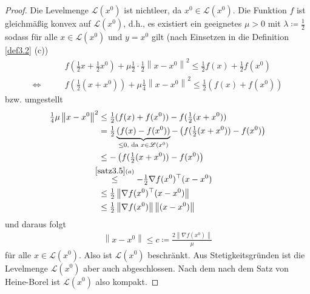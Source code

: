 \documentclass[a4paper,reqno]{amsart}
\theoremstyle{definition}
\theoremstyle{remark}
\newcommand\norm[1]{\left\lVert#1\right\rVert}
\begin{document}
\begin{proof}
    Die Levelmenge $\mathscr{L}(x^0)$ ist nichtleer, da
    $x^0\in\mathscr{L}(x^0)$.
    Die Funktion $f$ ist gleichmäßig konvex auf $\mathscr{L}(x^0)$,
    d.h., es existiert ein geeignetes $\mu>0$ mit $\lambda\coloneqq\frac{1}{2}$
    sodass für alle $x\in\mathscr{L}(x^0)$ und $y=x^0$ gilt (nach
    Einsetzen in die Definition \ref{def3.2} (c))
    \begin{align*}
        & f(\tfrac{1}{2} x+ \tfrac{1}{2}x^0) + \mu\tfrac{1}{2}\cdot\tfrac{1}{2}\norm{x-x^0}^2
        \leq \tfrac{1}{2} f(x) + \tfrac{1}{2}f(x^0)\\
        \Leftrightarrow\qquad
        & f(\tfrac{1}{2} (x+ x^0)) + \mu\tfrac{1}{4}\norm{x-x^0}^2
        \leq \tfrac{1}{2}\left( f(x) + f(x^0)\right)
    \end{align*}
    bzw. umgestellt
    \begin{align*}
        \tfrac{1}{4}\mu\norm{x-x^0}^2
        &\leq \tfrac{1}{2}( f(x) + f(x^0)) - f(\tfrac{1}{2} (x+ x^0))\\
        &= \tfrac{1}{2}\underbrace{( f(x) - f(x^0))}_{\leq0, \text{ da } x\in\mathscr{L}(x^0)}
        - \left(f(\tfrac{1}{2} (x+ x^0)) - f(x^0)\right)\\
        &\leq - \left(f(\tfrac{1}{2} (x+ x^0)) - f(x^0)\right)\\
        &\!\!\!\!\stackrel{\ref{satz3.5} (a)}{\leq}
        - \tfrac{1}{2}\nabla f(x^0)^\top(x-x^0)\\
        &\leq 
        \tfrac{1}{2}\norm{\nabla f(x^0)^\top(x-x^0)}\\
        &\leq 
        \tfrac{1}{2}\norm{\nabla f(x^0)}\norm{(x-x^0)}
    \end{align*}
    und daraus folgt
    \begin{align*}
        \norm{x-x^0}\leq c\coloneqq \frac{2\norm{\nabla f(x^0)}}{\mu}
    \end{align*}
    für alle $x\in\mathscr{L}(x^0)$. Also ist $\mathscr{L}(x^0)$
    beschränkt. Aus Stetigkeitsgründen ist die Levelmenge
    $\mathscr{L}(x^0)$ aber auch abgeschlossen. Nach dem nach dem Satz
    von Heine-Borel ist $\mathscr{L}(x^0)$ also kompakt.
\end{proof}
    
\end{document}
